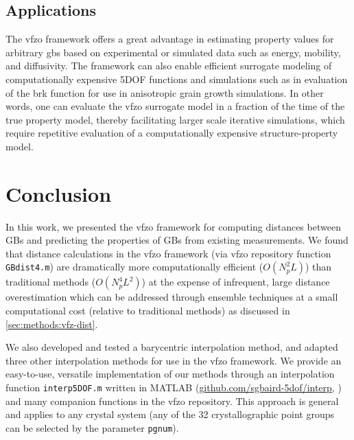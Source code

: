 \documentclass[final,twocolumn,12pt]{elsarticle}
\newcommand{\matlab}[1]{\mbox{\lstinline[style=Matlab-editor]{#1}}}
\newcommand{\vfzorepo}{\gls{vfzo} repository}
\begin{document}
\subsection{Applications}

The \gls{vfzo} framework offers a great advantage in estimating property values for arbitrary \glspl{gb} based on experimental or simulated data such as energy, mobility, and diffusivity. The framework can also enable efficient surrogate modeling of computationally expensive 5DOF functions and simulations such as in evaluation of the \gls{brk} function \cite{bulatovGrainBoundaryEnergy2014} for use in anisotropic grain growth simulations. In other words, one can evaluate the \gls{vfzo} surrogate model in a fraction of the time of the true property model, thereby facilitating larger scale iterative simulations, which require repetitive evaluation of a computationally expensive structure-property model.



\section{Conclusion} \label{sec:conclusion}

In this work, we presented the \gls{vfzo} framework for computing distances between GBs and predicting the properties of GBs from existing measurements. We found that distance calculations in the \gls{vfzo} framework (via \vfzorepo{} function \matlab{GBdist4.m}) are dramatically more computationally efficient ($O(N_p^2L)$) than traditional methods ($O(N_p^4L^2)$) at the expense of infrequent, large distance overestimation which can be addressed through ensemble techniques at a small computational cost (relative to traditional methods) as discussed in \cref{sec:methods:vfz-dist}.

We also developed and tested a barycentric interpolation method, and adapted three other interpolation methods for use in the \gls{vfzo} framework. We provide an easy-to-use, versatile implementation of our methods through an interpolation function \matlab{interp5DOF.m} written in MATLAB  (\url{github.com/sgbaird-5dof/interp}, \cite{bairdFiveDegreeofFreedom5DOF2020}) and many companion functions in the \vfzorepo{}.  This approach is general and applies to any crystal system (any of the 32 crystallographic point groups can be selected by the parameter \matlab{pgnum}). 
\end{document}
